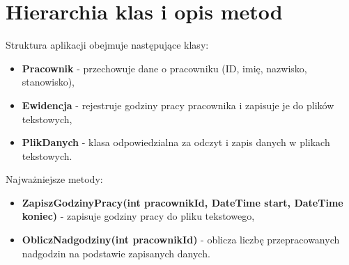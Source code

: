 \section{Hierarchia klas i opis metod}
\noindent Struktura aplikacji obejmuje następujące klasy:
\begin{itemize}
    \item \textbf{Pracownik} - przechowuje dane o pracowniku (ID, imię, nazwisko, stanowisko),
    \item \textbf{Ewidencja} - rejestruje godziny pracy pracownika i zapisuje je do plików tekstowych,
    \item \textbf{PlikDanych} - klasa odpowiedzialna za odczyt i zapis danych w plikach tekstowych.
\end{itemize}

Najważniejsze metody:
\begin{itemize}
    \item \textbf{ZapiszGodzinyPracy(int pracownikId, DateTime start, DateTime koniec)} - zapisuje godziny pracy do pliku tekstowego,
    \item \textbf{ObliczNadgodziny(int pracownikId)} - oblicza liczbę przepracowanych nadgodzin na podstawie zapisanych danych.
\end{itemize}